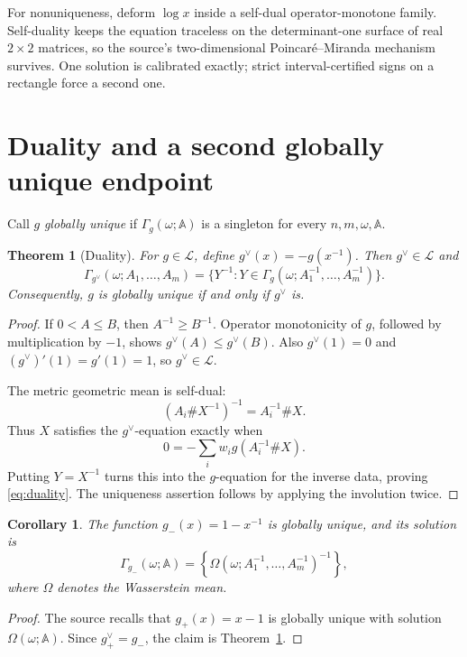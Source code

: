 \documentclass[11pt]{article}
\newcommand{\Gset}{\Gamma}
\newtheorem{theorem}{Theorem}
\newtheorem{corollary}{Corollary}
\begin{document}
For nonuniqueness, deform \(\log x\) inside a self-dual operator-monotone
family.  Self-duality keeps the equation traceless on the determinant-one
surface of real \(2\times2\) matrices, so the source's two-dimensional
Poincar\'e--Miranda mechanism survives.  One solution is calibrated exactly;
strict interval-certified signs on a rectangle force a second one.

\section{Duality and a second globally unique endpoint}

Call \(g\) \emph{globally unique} if \(\Gset_g(\omega;\mathbb A)\) is a
singleton for every \(n,m,\omega,\mathbb A\).

\begin{theorem}[Duality]\label{thm:duality}
For \(g\in\mathcal L\), define \(g^\vee(x)=-g(x^{-1})\).  Then
\(g^\vee\in\mathcal L\) and
\begin{equation}\label{eq:duality}
 \Gset_{g^\vee}(\omega;A_1,\ldots,A_m)
 =\{Y^{-1}:Y\in\Gset_g(\omega;A_1^{-1},\ldots,A_m^{-1})\}.
\end{equation}
Consequently, \(g\) is globally unique if and only if \(g^\vee\) is.
\end{theorem}

\begin{proof}
If \(0<A\le B\), then \(A^{-1}\ge B^{-1}\).  Operator monotonicity of
\(g\), followed by multiplication by \(-1\), shows
\(g^\vee(A)\le g^\vee(B)\).  Also \(g^\vee(1)=0\) and
\((g^\vee)'(1)=g'(1)=1\), so \(g^\vee\in\mathcal L\).

The metric geometric mean is self-dual:
\[
 (A_i\#X^{-1})^{-1}=A_i^{-1}\#X.
\]
Thus \(X\) satisfies the \(g^\vee\)-equation exactly when
\[
 0=-\sum_iw_i g(A_i^{-1}\#X).
\]
Putting \(Y=X^{-1}\) turns this into the \(g\)-equation for the inverse
data, proving \eqref{eq:duality}.  The uniqueness assertion follows by
applying the involution twice.
\end{proof}

\begin{corollary}\label{cor:endpoint}
The function \(g_-(x)=1-x^{-1}\) is globally unique, and its solution is
\[
 \Gset_{g_-}(\omega;\mathbb A)
 =\left\{\Omega(\omega;A_1^{-1},\ldots,A_m^{-1})^{-1}\right\},
\]
where \(\Omega\) denotes the Wasserstein mean.
\end{corollary}

\begin{proof}
The source recalls that \(g_+(x)=x-1\) is globally unique with solution
\(\Omega(\omega;\mathbb A)\).  Since \(g_+^\vee=g_-\), the claim is
Theorem~\ref{thm:duality}.
\end{proof}
\end{document}
